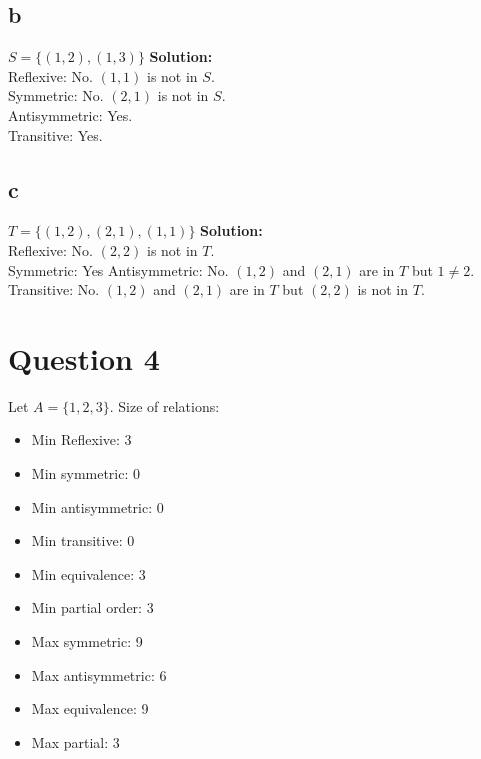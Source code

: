 \documentclass{article}
\begin{document}
\subsection*{b}
$S = \{(1,2),(1,3)\}$
\textbf{Solution:}\\
Reflexive: No. $(1,1)$ is not in $S$.\\
Symmetric: No. $(2,1)$ is not in $S$.\\
Antisymmetric: Yes. \\
Transitive: Yes.
\subsection*{c}
$T = \{(1,2),(2,1),(1,1)\}$
\textbf{Solution:}\\
Reflexive: No. $(2,2)$ is not in $T$.\\
Symmetric: Yes
Antisymmetric: No. $(1,2)$ and $(2,1)$ are in $T$ but $1 \neq 2$.\\
Transitive: No. $(1,2)$ and $(2,1)$ are in $T$ but $(2,2)$ is not in $T$.\\
\section*{Question 4}
Let $A = \{1,2,3\}$. Size of relations:
\begin{itemize}
    \item Min Reflexive: 3
    \item Min symmetric: 0
    \item Min antisymmetric: 0
    \item Min transitive: 0
    \item Min equivalence: 3
    \item Min partial order: 3
    \item Max symmetric: 9
    \item Max antisymmetric: 6
    \item Max equivalence: 9 
    \item Max partial: 3 
\end{itemize}
\end{document}
